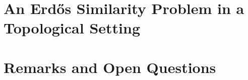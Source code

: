 \documentclass[12pt,oneside]{sfsuthesis}
\begin{document}
\chapter{An Erd\H{o}s Similarity Problem in a Topological Setting}



\chapter{Remarks and Open Questions}



\printbibliography
\end{document}
